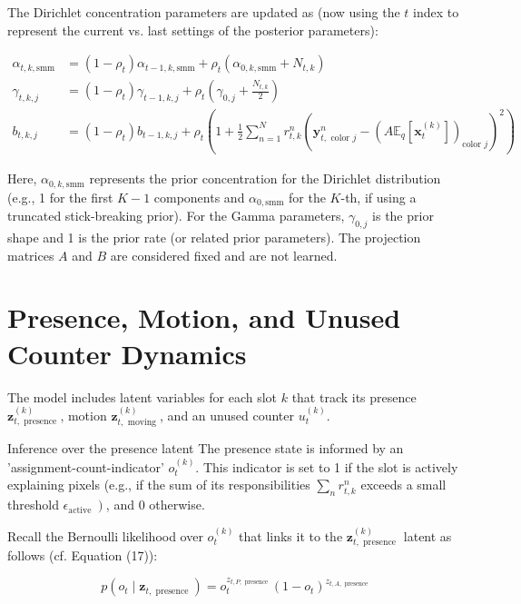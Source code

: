 \documentclass[10pt]{article}
\begin{document}
The Dirichlet concentration parameters are updated as (now using the $t$ index to represent the current vs. last settings of the posterior parameters):


\begin{align*}
\alpha_{t, k, \mathrm{smm}} & =\left(1-\rho_{t}\right) \alpha_{t-1, k, \mathrm{smm}}+\rho_{t}\left(\alpha_{0, k, \mathrm{smm}}+N_{t, k}\right) \\
\gamma_{t, k, j} & =\left(1-\rho_{t}\right) \gamma_{t-1, k, j}+\rho_{t}\left(\gamma_{0, j}+\frac{N_{t, k}}{2}\right)  \tag{43}\\
b_{t, k, j} & =\left(1-\rho_{t}\right) b_{t-1, k, j}+\rho_{t}\left(1+\frac{1}{2} \sum_{n=1}^{N} r_{t, k}^{n}\left(\mathbf{y}_{t, \text { color } j}^{n}-\left(A \mathbb{E}_{q}\left[\mathbf{x}_{t}^{(k)}\right]\right)_{\text {color } j}\right)^{2}\right)
\end{align*}


Here, $\alpha_{0, k, \mathrm{smm}}$ represents the prior concentration for the Dirichlet distribution (e.g., 1 for the first $K-1$ components and $\alpha_{0, \mathrm{smm}}$ for the $K$-th, if using a truncated stick-breaking prior). For the Gamma parameters, $\gamma_{0, j}$ is the prior shape and 1 is the prior rate (or related prior parameters). The projection matrices $A$ and $B$ are considered fixed and are not learned.

\section*{Presence, Motion, and Unused Counter Dynamics}
The model includes latent variables for each slot $k$ that track its presence $\mathbf{z}_{t, \text { presence }}^{(k)}$, motion $\mathbf{z}_{t, \text { moving }}^{(k)}$, and an unused counter $u_{t}^{(k)}$.

Inference over the presence latent The presence state is informed by an 'assignment-count-indicator' $o_{t}^{(k)}$. This indicator is set to 1 if the slot is actively explaining pixels (e.g., if the sum of its responsibilities $\sum_{n} r_{t, k}^{n}$ exceeds a small threshold $\left.\epsilon_{\text {active }}\right)$, and 0 otherwise.

Recall the Bernoulli likelihood over $o_{t}^{(k)}$ that links it to the $\mathbf{z}_{t, \text { presence }}^{(k)}$ latent as follows (cf. Equation (17)):


\begin{equation*}
p\left(o_{t} \mid \mathbf{z}_{t, \text { presence }}\right)=o_{t}^{z_{t, P, \text { presence }}}\left(1-o_{t}\right)^{z_{t, A, \text { presence }}} \tag{44}
\end{equation*}
\end{document}
